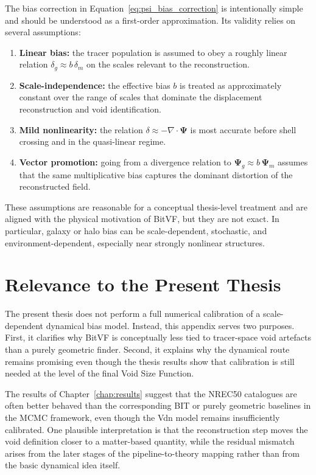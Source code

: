 \documentclass[12pt]{report}
\begin{document}
The bias correction in Equation~\ref{eq:psi_bias_correction} is intentionally simple and should be understood as a first-order approximation. Its validity relies on several assumptions:
\begin{enumerate}
    \item \textbf{Linear bias:} the tracer population is assumed to obey a roughly linear relation $\delta_g \approx b\,\delta_m$ on the scales relevant to the reconstruction.
    \item \textbf{Scale-independence:} the effective bias $b$ is treated as approximately constant over the range of scales that dominate the displacement reconstruction and void identification.
    \item \textbf{Mild nonlinearity:} the relation $\delta \approx -\nabla\cdot\boldsymbol{\Psi}$ is most accurate before shell crossing and in the quasi-linear regime.
    \item \textbf{Vector promotion:} going from a divergence relation to $\boldsymbol{\Psi}_g \approx b\,\boldsymbol{\Psi}_m$ assumes that the same multiplicative bias captures the dominant distortion of the reconstructed field.
\end{enumerate}

These assumptions are reasonable for a conceptual thesis-level treatment and are aligned with the physical motivation of BitVF, but they are not exact. In particular, galaxy or halo bias can be scale-dependent, stochastic, and environment-dependent, especially near strongly nonlinear structures.

\section{Relevance to the Present Thesis}

The present thesis does not perform a full numerical calibration of a scale-dependent dynamical bias model. Instead, this appendix serves two purposes. First, it clarifies why BitVF is conceptually less tied to tracer-space void artefacts than a purely geometric finder. Second, it explains why the dynamical route remains promising even though the thesis results show that calibration is still needed at the level of the final Void Size Function.

The results of Chapter~\ref{chap:results} suggest that the NREC50 catalogues are often better behaved than the corresponding BIT or purely geometric baselines in the MCMC framework, even though the Vdn model remains insufficiently calibrated. One plausible interpretation is that the reconstruction step moves the void definition closer to a matter-based quantity, while the residual mismatch arises from the later stages of the pipeline-to-theory mapping rather than from the basic dynamical idea itself.
\end{document}
